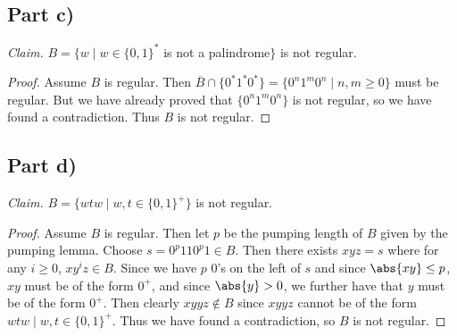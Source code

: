\documentclass{abrice}
\newcommand{\comp}[1]{\overline{#1}}%
\begin{document}
\subsection{Part c)}

\emph{Claim.} $B = \{ w \mid w \in {\{0,1\}}^*$ is not a palindrome$\}$ is not
regular.

\begin{proof}
  Assume $B$ is regular. Then $\comp{B} \cap \{0^* 1^* 0^*\} = \{ 0^n 1^m 0^n
  \mid n,m \geq 0\}$ must be regular. But we have already proved that $\{0^n 1^m
  0^n\}$ is not regular, so we have found a contradiction. Thus $B$ is not
  regular.
\end{proof}

\subsection{Part d)}

\emph{Claim.} $B = \{ wtw \mid w,t \in \{0,1\}^+ \}$ is not regular.

\begin{proof}
  Assume $B$ is regular. Then let $p$ be the pumping length of $B$ given by the
  pumping lemma. Choose $s = 0^p 1 1 0^p 1 \in B$. Then there exists $xyz = s$
  where for any $i \geq 0$, $xy^iz \in B$. Since we have $p$ $0$'s on the left
  of $s$ and since $\abs{xy} \leq p$, $xy$ must be of the form $0^+$, and since
  $\abs{y} > 0$, we further have that $y$ must be of the form $0^+$. Then
  clearly $xyyz \notin B$ since $xyyz$ cannot be of the form $wtw \mid w,t \in
  {\{0,1\}}^+$. Thus we have found a contradiction, so $B$ is not regular.

\end{proof}
\end{document}
